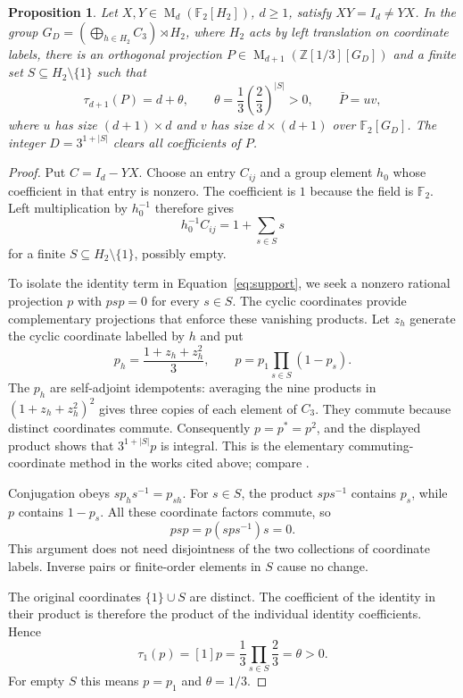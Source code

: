 \documentclass[11pt]{article}
\newtheorem{proposition}[theorem]{Proposition}
\theoremstyle{remark}
\numberwithin{equation}{section}
\newcommand{\F}{\mathbb F}
\newcommand{\Z}{\mathbb Z}
\newcommand{\Mat}{\operatorname{M}}
\begin{document}
\begin{proposition}\label{prop:separation}
Let $X,Y\in\Mat_d(\F_2[H_2])$, $d\ge1$, satisfy
$XY=I_d\ne YX$. In the group
$G_D=(\bigoplus_{h\in H_2}C_3)\rtimes H_2$, where $H_2$ acts
by left translation on coordinate labels, there is an orthogonal
projection $P\in\Mat_{d+1}(\Z[1/3][G_D])$ and a finite set
$S\subseteq H_2\setminus\{1\}$ such that
\[
 \tau_{d+1}(P)=d+\theta,\qquad
 \theta=\frac13\left(\frac23\right)^{|S|}>0,
 \qquad \bar P=uv,
\]
where $u$ has size $(d+1)\times d$ and $v$ has size $d\times(d+1)$
over $\F_2[G_D]$. The integer $D=3^{1+|S|}$ clears all coefficients
of $P$.
\end{proposition}

\begin{proof}
Put $C=I_d-YX$. Choose an entry $C_{ij}$ and a group element
$h_0$ whose coefficient in that entry is nonzero. The coefficient
is $1$ because the field is $\F_2$. Left multiplication by
$h_0^{-1}$ therefore gives
\begin{equation}\label{eq:support}
 h_0^{-1}C_{ij}=1+\sum_{s\in S}s
\end{equation}
for a finite $S\subseteq H_2\setminus\{1\}$, possibly empty.

To isolate the identity term in Equation~\eqref{eq:support}, we
seek a nonzero rational projection $p$ with $psp=0$ for every
$s\in S$. The cyclic coordinates provide complementary projections
that enforce these vanishing products. Let $z_h$ generate the cyclic
coordinate labelled by $h$ and put
\[
 p_h=\frac{1+z_h+z_h^2}{3},\qquad
 p=p_1\prod_{s\in S}(1-p_s).
\]
The $p_h$ are self-adjoint idempotents: averaging the nine products
in $(1+z_h+z_h^2)^2$ gives three copies of each element of $C_3$.
They commute because distinct coordinates commute. Consequently
$p=p^*=p^2$, and the displayed product shows that $3^{1+|S|}p$
is integral. This is the elementary commuting-coordinate method
in the works cited above; compare
\cite[Lemmas 3.1 and 3.4]{DicksSchick2002}.

Conjugation obeys $s p_hs^{-1}=p_{sh}$. For $s\in S$, the
product $sps^{-1}$ contains $p_s$, while $p$ contains $1-p_s$.
All these coordinate factors commute, so
\begin{equation}\label{eq:separation}
 psp=p(sps^{-1})s=0.
\end{equation}
This argument does not need disjointness of the two collections of
coordinate labels. Inverse pairs or finite-order elements in $S$
cause no change.

The original coordinates $\{1\}\cup S$ are distinct. The coefficient
of the identity in their product is therefore the product of the
individual identity coefficients. Hence
\begin{equation}\label{eq:theta}
 \tau_1(p)=[1]p=\frac13\prod_{s\in S}\frac23=\theta>0.
\end{equation}
For empty $S$ this means $p=p_1$ and $\theta=1/3$.


\end{proof}
\end{document}
